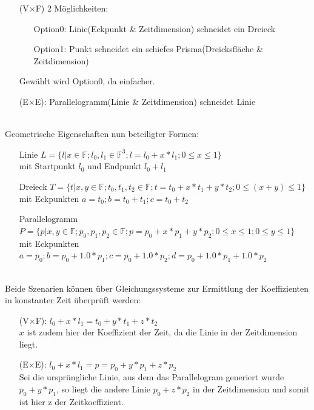 		\begin{itemize}
			\item [(V$\times$F)] 2 Möglichkeiten:
				\begin{itemize}
					\item[Option0:] Linie(Eckpunkt \& Zeitdimension) schneidet ein Dreieck
					\item[Option1:] Punkt schneidet ein schiefes Prisma(Dreicksfläche \& Zeitdimension)
				\end{itemize}
				Gewählt wird Option0, da einfacher.
			\item [(E$\times$E):]  Parallelogramm(Linie \& Zeitdimension) schneidet Linie
		\end{itemize}
\ \\
		Geometrische Eigenschaften nun beteiligter Formen:
		\begin{itemize}
			\item [Linie] $L = \{l | x\in\mathbb{F} ; l_0, l_1 \in \mathbb{F}^3 ; l = l_0 + x * l_1; 0\le x\le 1 \}$ \\
			mit Startpunkt $l_0$ und Endpunkt $l_0 + l_1$
		\item [Dreieck] $T = \{t | x,y \in\mathbb{F}; t_0, t_1, t_2 \in \mathbb{F}; t = t_0 + x*t_1 + y*t_2; 0\le (x+y) \le 1\}$\\
			mit Eckpunkten $a = t_0 ; b = t_0 + t_1 ; c = t_0 + t_2$ 
			\item [Parallelogramm] $P = \{p | x,y \in\mathbb{F}; p_0, p_1, p_2 \in \mathbb{F}; p = p_0 + x*p_1 + y*p_2; 0\le x\le 1; 0\le y\le 1\}$\\
			mit Eckpunkten $a = p_0 ; b = p_0 + 1.0*p_1 ; c = p_0 + 1.0*p_2; d = p_0 + 1.0*p_1 + 1.0*p_2$ 
		\end{itemize}
\ \\
		Beide Szenarien können über Gleichungssysteme zur Ermittlung der Koeffizienten in konstanter Zeit überprüft werden:
		\begin{itemize}
			\item [(V$\times$F):] $l_0 + x * l_1 = t_0 + y*t_1 + z*t_2$\\
				$x$ ist zudem hier der Koeffizient der Zeit, da die Linie in der Zeitdimension liegt.
			\item [(E$\times$E):] $l_0 + x * l_1 = p = p_0 + y*p_1 + z*p_2$\\
				Sei die ursprüngliche Linie, aus dem das Parallelogram generiert wurde $p_0+y*p_1$, so liegt die andere Linie $p_0 + z*p_2$ in der Zeitdimension und somit ist hier z der Zeitkoeffizient.
		\end{itemize}
